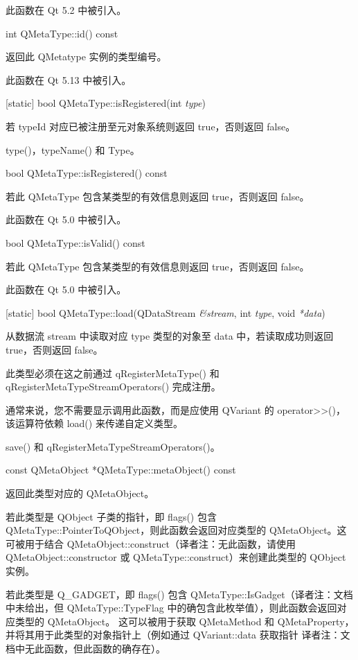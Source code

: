 此函数在 Qt 5.2 中被引入。

int QMetaType::id() const

返回此 QMetatype 实例的类型编号。

此函数在 Qt 5.13 中被引入。

[static] bool QMetaType::isRegistered(int \emph{type})

若 typeId 对应已被注册至元对象系统则返回 true，否则返回 false。

\begin{seeAlso}
type()，typeName() 和 Type。
\end{seeAlso}

bool QMetaType::isRegistered() const

若此 QMetaType 包含某类型的有效信息则返回 true，否则返回 false。

此函数在 Qt 5.0 中被引入。

bool QMetaType::isValid() const

若此 QMetaType 包含某类型的有效信息则返回 true，否则返回 false。

此函数在 Qt 5.0 中被引入。

[static] bool QMetaType::load(QDataStream \emph{\&stream}, int \emph{type}, void \emph{*data})

从数据流 stream 中读取对应 type 类型的对象至 data 中，若读取成功则返回 true，否则返回 false。

此类型必须在这之前通过 qRegisterMetaType() 和 qRegisterMetaTypeStreamOperators() 完成注册。

通常来说，您不需要显示调用此函数，而是应使用 QVariant 的 operator>>()，该运算符依赖 load() 来传递自定义类型。

\begin{seeAlso}
save() 和 qRegisterMetaTypeStreamOperators()。
\end{seeAlso}

const QMetaObject *QMetaType::metaObject() const

返回此类型对应的 QMetaObject。

若此类型是 QObject 子类的指针，即 flags() 包含 QMetaType::PointerToQObject，则此函数会返回对应类型的 QMetaObject。这可被用于结合 QMetaObject::construct（译者注：无此函数，请使用 QMetaObject::constructor 或 QMetaType::construct）来创建此类型的 QObject 实例。

若此类型是 Q\_GADGET，即 flags() 包含 QMetaType::IsGadget（译者注：文档中未给出，但 QMetaType::TypeFlag 中的确包含此枚举值），则此函数会返回对应类型的 QMetaObject。
这可以被用于获取 QMetaMethod 和 QMetaProperty，并将其用于此类型的对象指针上（例如通过 QVariant::data 获取指针 译者注：文档中无此函数，但此函数的确存在）。

